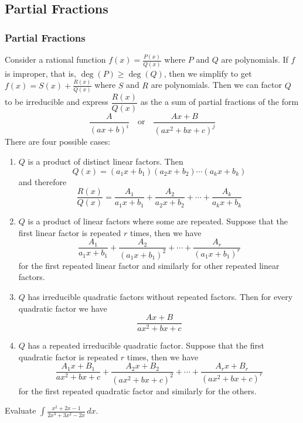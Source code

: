 \subsection{Partial Fractions}
\subsubsection{Partial Fractions}
Consider a rational function \(\displaystyle{f(x)=\frac{P(x)}{Q(x)}}\) where
\(P\) and \(Q\) are polynomials.
If \(f\) is improper, that is, \(\deg(P)\geq\deg(Q)\), then we simplify to get
\(\displaystyle{f(x)=S(x)+\frac{R(x)}{Q(x)}}\) where \(S\) and \(R\) are
polynomials.
Then we can factor \(Q\) to be irreducible and express \(\dfrac{R(x)}{Q(x)}\)
as the a sum of partial fractions of the form
\[\frac{A}{(ax+b)^i}\quad\text{or}\quad\frac{Ax+B}{(ax^2+bx+c)^j}\]
There are four possible cases:
\begin{enumerate}
    \item \(Q\) is a product of distinct linear factors.
    Then
    \[Q(x)=(a_1 x+b_1)(a_2 x+b_2)\cdots(a_k x+b_k)\]
    and therefore
    \[\frac{R(x)}{Q(x)}=\frac{A_1}{a_1 x+b_1}+\frac{A_2}{a_2 x+b_2}+\cdots+
    \frac{A_k}{a_k x+b_k}\]
    \item \(Q\) is a product of linear factors where some are repeated.
    Suppose that the first linear factor is repeated \(r\) times, then we have
    \[\frac{A_1}{a_1 x+b_1}+\frac{A_2}{(a_1 x+b_1)^2}+\cdots+
    \frac{A_r}{(a_1 x+b_1)^r}\]
    for the first repeated linear factor and similarly for other repeated
    linear factors.
    \item \(Q\) has irreducible quadratic factors without repeated
    factors.
    Then for every quadratic factor we have
    \[\frac{Ax+B}{ax^2+bx+c}\]
    \item \(Q\) has a repeated irreducible quadratic factor.
    Suppose that the first quadratic factor is repeated \(r\) times,
    then we have
    \[\frac{A_1 x+B_1}{ax^2+bx+c}+\frac{A_2 x+B_2}{(ax^2+bx+c)^2}+\cdots
    +\frac{A_r x+B_r}{(ax^2+bx+c)^r}\]
    for the first repeated quadratic factor and similarly for the others.
\end{enumerate}
\begin{problem}
    Evaluate \(\displaystyle{\int\frac{x^2+2x-1}{2x^3+3x^2-2x}\,dx}\).
\end{problem}
